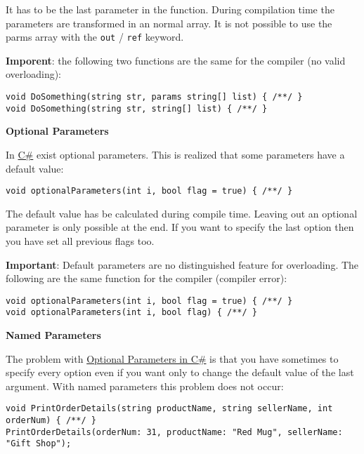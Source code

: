 \documentclass[11pt,twoside,landscape]{article}
\begin{document}
\begin{multicols}{3}
It has to be the last parameter in the function. During compilation time the parameters are transformed in an normal array. It is not possible to use the parms array with the \texttt{out} / \texttt{ref} keyword.

\textbf{Imporent}: the following two functions are the same for the compiler (no valid overloading):
\lstset{language=csharp,label= ,caption= ,captionpos=b,numbers=none}
\begin{lstlisting}
void DoSomething(string str, params string[] list) { /**/ }
void DoSomething(string str, string[] list) { /**/ }
\end{lstlisting}

\textbf{Optional Parameters}

In \href{../../../roam/20211003114158-c.org}{C\#} exist optional parameters.
This is realized that some parameters have a default value:
\lstset{language=csharp,label= ,caption= ,captionpos=b,numbers=none}
\begin{lstlisting}
void optionalParameters(int i, bool flag = true) { /**/ }
\end{lstlisting}

The default value has be calculated during compile time.
Leaving out an optional parameter is only possible at the end.
If you want to specify the last option then you have set all previous flags too.

\textbf{Important}: Default parameters are no distinguished feature for overloading.
The following are the same function for the compiler (compiler error):
\lstset{language=csharp,label= ,caption= ,captionpos=b,numbers=none}
\begin{lstlisting}
void optionalParameters(int i, bool flag = true) { /**/ }
void optionalParameters(int i, bool flag) { /**/ }
\end{lstlisting}

\textbf{Named Parameters}

The problem with \href{../../../roam/20211008100451-optional_parameters_in_c.org}{Optional Parameters in C\#} is that you have sometimes to specify every option even if you want only to change the default value of the last argument.
With named parameters this problem does not occur:
\lstset{language=csharp,label= ,caption= ,captionpos=b,numbers=none}
\begin{lstlisting}
void PrintOrderDetails(string productName, string sellerName, int orderNum) { /**/ }
PrintOrderDetails(orderNum: 31, productName: "Red Mug", sellerName: "Gift Shop");
\end{lstlisting}


\end{multicols}
\end{document}
